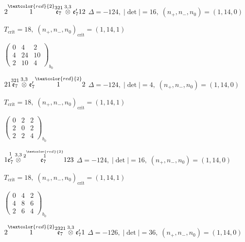 \documentclass[10pt]{article}
\begin{document}
$2\overset{\textcolor{red}{2}}{1}\overset{321}{\mathfrak{e}_7}\overset{3,3}{\otimes}\mathfrak{e}_7'12$ \quad $\Delta=-124,\; |\det|=16,\; (n_+,n_-,n_0)=(1,14,0)$

\hspace{1em}$T_{\text{crit}}=18,\; (n_+,n_-,n_0)_{\text{crit}}=(1,14,1)$

\hspace{2em}$\left(\begin{smallmatrix}0 & 4 & 2 \\ 4 & 24 & 10 \\ 2 & 10 & 4\end{smallmatrix}\right)_{\!b_0}$

$21\overset{321}{\mathfrak{e}_7}\overset{3,3}{\otimes}\mathfrak{e}_7'\overset{\textcolor{red}{2}}{1}2$ \quad $\Delta=-124,\; |\det|=4,\; (n_+,n_-,n_0)=(1,14,0)$

\hspace{1em}$T_{\text{crit}}=18,\; (n_+,n_-,n_0)_{\text{crit}}=(1,14,1)$

\hspace{2em}$\left(\begin{smallmatrix}0 & 2 & 2 \\ 2 & 0 & 2 \\ 2 & 2 & 4\end{smallmatrix}\right)_{\!b_0}$

\smallskip

$1\overset{1}{\mathfrak{e}_7'}\overset{3,3}{\otimes}\overset{2\overset{\textcolor{red}{2}}{1}}{\mathfrak{e}_7}123$ \quad $\Delta=-124,\; |\det|=16,\; (n_+,n_-,n_0)=(1,14,0)$

\hspace{1em}$T_{\text{crit}}=18,\; (n_+,n_-,n_0)_{\text{crit}}=(1,14,1)$

\hspace{2em}$\left(\begin{smallmatrix}0 & 4 & 2 \\ 4 & 8 & 6 \\ 2 & 6 & 4\end{smallmatrix}\right)_{\!b_0}$

\smallskip

$2\overset{\textcolor{red}{2}}{1}\overset{2321}{\mathfrak{e}_7}\overset{3,3}{\otimes}\mathfrak{e}_7'1$ \quad $\Delta=-126,\; |\det|=36,\; (n_+,n_-,n_0)=(1,14,0)$
\end{document}
